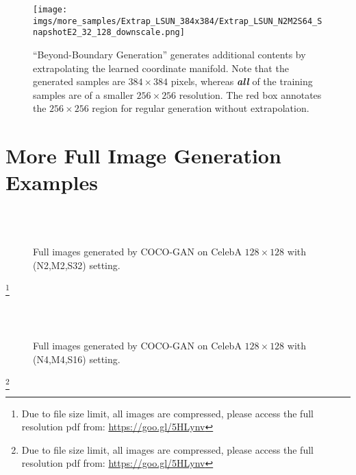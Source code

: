 \documentclass{article}
\newcommand{\modelName}{COCO-GAN }
\newcommand\blfootnote[1]{\begingroup
  \renewcommand\thefootnote{}\footnote{#1}\addtocounter{footnote}{-1}\endgroup
}
\begin{document}
\begin{appendices}
    \begin{figure}[H]
        \vspace{2em}
        \centering
        \texttt{[image: imgs/more\_samples/Extrap\_LSUN\_384x384/Extrap\_LSUN\_N2M2S64\_SnapshotE2\_32\_128\_downscale.png]}
        \caption{``Beyond-Boundary Generation'' generates additional contents by extrapolating the learned coordinate manifold. Note that the generated samples are $384\times384$ pixels, whereas \textbf{\textit{all}} of the training samples are of a smaller $256\times256$ resolution. The {\color{red} red} box annotates the $256\times256$ region for regular generation without extrapolation.}
        \label{fig:more-beyond-boundary-generation}
    \end{figure}
    
\section{More Full Image Generation Examples}
    \label{appendix:more-full-images}
    \begin{figure}[H]
        \centering
         \\ [0.5em]
         \\ [0.5em]
        \caption{Full images generated by \modelName on CelebA $128\times128$ with (N2,M2,S32) setting.}
        \label{fig:more-generation}
        \vspace{-1em}
    \end{figure}
    \blfootnote{Due to file size limit, all images are compressed, please access the full resolution pdf from: {\color{blue}\urlstyle{same}\url{https://goo.gl/5HLynv}}}
    
    \begin{figure}[H]
        \centering
         \\
         \\
        \caption{Full images generated by \modelName on CelebA $128\times128$ with (N4,M4,S16) setting.}
    \end{figure}
    \blfootnote{Due to file size limit, all images are compressed, please access the full resolution pdf from: {\color{blue}\urlstyle{same}\url{https://goo.gl/5HLynv}}}
    

\end{appendices}
\end{document}
